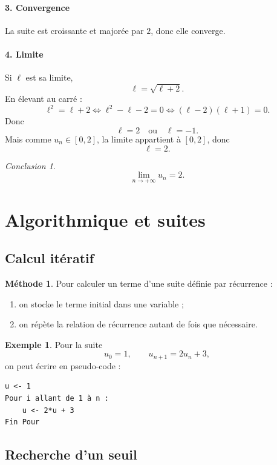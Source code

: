 \documentclass[11pt,a4paper]{article}
\theoremstyle{definition}
\newtheorem{exemple}[definition]{Exemple}
\newtheorem{methode}[definition]{Méthode}
\theoremstyle{plain}
\theoremstyle{remark}
\newtheorem*{conclusion}{Conclusion}
\begin{document}
\paragraph{3. Convergence}
La suite est croissante et majorée par $2$, donc elle converge.

\paragraph{4. Limite}
Si $\ell$ est sa limite,
\[
\ell=\sqrt{\ell+2}.
\]
En élevant au carré :
\[
\ell^2=\ell+2
\iff
\ell^2-\ell-2=0
\iff
(\ell-2)(\ell+1)=0.
\]
Donc
\[
\ell=2 \quad \text{ou} \quad \ell=-1.
\]
Mais comme $u_n\in[0,2]$, la limite appartient à $[0,2]$, donc
\[
\ell=2.
\]

\begin{conclusion}
\[
\boxed{\lim_{n\to+\infty}u_n=2.}
\]
\end{conclusion}

\section{Algorithmique et suites}

\subsection{Calcul itératif}

\begin{methode}
Pour calculer un terme d'une suite définie par récurrence :
\begin{enumerate}[label=\arabic*.]
    \item on stocke le terme initial dans une variable ;
    \item on répète la relation de récurrence autant de fois que nécessaire.
\end{enumerate}
\end{methode}

\begin{exemple}
Pour la suite
\[
u_0=1,\qquad u_{n+1}=2u_n+3,
\]
on peut écrire en pseudo-code :
\begin{verbatim}
u <- 1
Pour i allant de 1 à n :
    u <- 2*u + 3
Fin Pour
\end{verbatim}
\end{exemple}

\subsection{Recherche d'un seuil}
\end{document}
